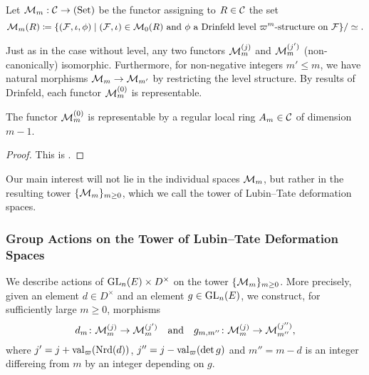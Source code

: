 \documentclass[../main.tex]{subfiles}
\begin{document}
\begin{defi}\label{def:LTDefSpaceWithLevel}
  Let $\mathcal{M}_m: \mathcal{C} \to {(\mathrm{Set})}$ be the functor assigning to $R \in \mathcal{C}$ the set 
  \begin{equation*}
    \mathcal{M}_m(R) \coloneqq \{(\mathcal{F}, \iota, \phi) \mid (\mathcal{F}, \iota) \in \mathcal{M}_0(R) \text{ and }\phi
    \text{ a Drinfeld level $\varpi^m$-structure on $\mathcal{F}$}\}/\simeq.
  \end{equation*}
\end{defi}

Just as in the case without level, any two functors $\mathcal{M}_m^{(j)}$ and
$\mathcal{M}_m^{(j')}$ (non-canonically) isomorphic.
Furthermore, for non-negative integers $m' \leq m$, we have
natural morphisms
$\mathcal{M}_m \to \mathcal{M}_{m'}$ by restricting the level structure. 
By results of Drinfeld, each functor $\mathcal{M}_m^{(0)}$ is representable.

\begin{thm}\label{thm:RepresentabilityOfDefSpaceWithLevel}
  The functor $\mathcal{M}_m^{(0)}$ is representable by a regular local ring $A_m \in \mathcal{C}$ of 
  dimension $m-1$.
\begin{proof}
  This is \cite[Proposition 4.3]{drinfel1974elliptic}.
\end{proof}
\end{thm}

Our main interest will
not lie in the individual spaces $\mathcal{M}_m$, but rather in the resulting tower
$\{\mathcal{M}_m\}_{m \geq 0}$, which we call the tower of Lubin--Tate deformation
spaces.



\subsubsection{Group Actions on the Tower of Lubin--Tate Deformation Spaces} %
\label{ssub:Group Actions on the Tower of Lubin--Tate Deformation Spaces}
We describe actions of $\operatorname{GL}_n(E) \times D^\times$ on the tower
$\{\mathcal{M}_m\}_{m \geq 0}$. More precisely, given an element $d \in D^\times$ and an element
$g \in \operatorname{GL}_n(E)$, we construct, for sufficiently large $m\geq 0$, morphisms
\begin{equation*}
  d_m \colon \mathcal{M}_m^{(j)} \to \mathcal{M}_m^{(j')} \quad \text{and} \quad
  g_{m,m''} \colon \mathcal{M}_m^{(j)} \to \mathcal{M}_{m''}^{(j'')},
\end{equation*}
where $j'= j+\mathrm{val}_\varpi(\operatorname{Nrd}(d))$, $j'' = j - \mathrm{val}_\varpi(\det g)$ and $m''
= m-d$ is an integer differeing from $m$ by an integer depending on $g$. 
\end{document}

